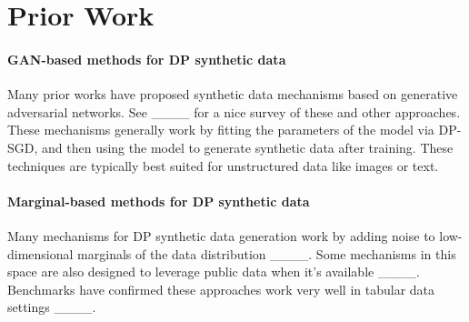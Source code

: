 \section{Prior Work}
\label{sec:prior_work}

\paragraph{GAN-based methods for DP synthetic data}

Many prior works have proposed synthetic data mechanisms based on generative adversarial networks.  See ____ for a nice survey of these and other approaches.  These mechanisms generally work by fitting the parameters of the model via DP-SGD, and then using the model to generate synthetic data after training.  These techniques are typically best suited for unstructured data like images or text.

\paragraph{Marginal-based methods for DP synthetic data}

Many mechanisms for DP synthetic data generation work by adding noise to low-dimensional marginals of the data distribution ____.  Some mechanisms in this space are also designed to leverage public data when it's available ____.  Benchmarks have confirmed these approaches work very well in tabular data settings ____.


